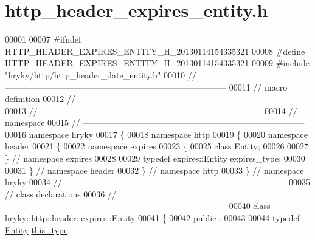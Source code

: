 \hypertarget{http__header__expires__entity_8h_source}{\section{http\-\_\-header\-\_\-expires\-\_\-entity.\-h}
}

\begin{DoxyCode}
00001 
00007 \textcolor{preprocessor}{#ifndef HTTP\_HEADER\_EXPIRES\_ENTITY\_H\_20130114154335321}
00008 \textcolor{preprocessor}{}\textcolor{preprocessor}{#define HTTP\_HEADER\_EXPIRES\_ENTITY\_H\_20130114154335321}
00009 \textcolor{preprocessor}{}\textcolor{preprocessor}{#include "hryky/http/http\_header\_date\_entity.h"}
00010 \textcolor{comment}{//
      ------------------------------------------------------------------------------}
00011 \textcolor{comment}{// macro definition}
00012 \textcolor{comment}{//
      ------------------------------------------------------------------------------}
00013 \textcolor{comment}{//
      ------------------------------------------------------------------------------}
00014 \textcolor{comment}{// namespace}
00015 \textcolor{comment}{//
      ------------------------------------------------------------------------------}
00016 \textcolor{keyword}{namespace }hryky
00017 \{
00018 \textcolor{keyword}{namespace }http
00019 \{
00020 \textcolor{keyword}{namespace }header
00021 \{
00022 \textcolor{keyword}{namespace }expires
00023 \{
00025     \textcolor{keyword}{class }Entity;
00026 
00027 \} \textcolor{comment}{// namespace expires}
00028 
00029 \textcolor{keyword}{typedef} expires::Entity expires\_type;
00030 
00031 \} \textcolor{comment}{// namespace header}
00032 \} \textcolor{comment}{// namespace http}
00033 \} \textcolor{comment}{// namespace hryky}
00034 \textcolor{comment}{//
      ------------------------------------------------------------------------------}
00035 \textcolor{comment}{// class declarations}
00036 \textcolor{comment}{//
      ------------------------------------------------------------------------------}
\hypertarget{http__header__expires__entity_8h_source_l00040}{}\hyperlink{classhryky_1_1http_1_1header_1_1expires_1_1_entity}{00040} \textcolor{comment}{}\textcolor{keyword}{class }\hyperlink{classhryky_1_1http_1_1header_1_1expires_1_1_entity}{hryky::http::header::expires::Entity}
00041 \{
00042 \textcolor{keyword}{public} :
00043 
\hypertarget{http__header__expires__entity_8h_source_l00044}{}\hyperlink{classhryky_1_1http_1_1header_1_1expires_1_1_entity_a5e5a7c42055d9ada9f441424a82868f8}{00044}     \textcolor{keyword}{typedef} \hyperlink{classhryky_1_1http_1_1header_1_1expires_1_1_entity}{Entity} \hyperlink{classhryky_1_1http_1_1header_1_1expires_1_1_entity_a5e5a7c42055d9ada9f441424a82868f8}{this_type};

\end{DoxyCode}
